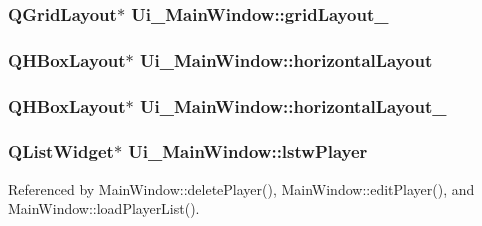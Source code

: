 \subsubsection[{grid\+Layout\+\_\+2}]{\setlength{\rightskip}{0pt plus 5cm}Q\+Grid\+Layout$\ast$ Ui\+\_\+\+Main\+Window\+::grid\+Layout\+\_}\label{class_ui___main_window_a6b2a0c5f7e8ff2a87134908dd770d2d2}
\hypertarget{class_ui___main_window_acd6fdc9ebacc4b25b834162380d75ce8}{}
\subsubsection[{horizontal\+Layout}]{\setlength{\rightskip}{0pt plus 5cm}Q\+H\+Box\+Layout$\ast$ Ui\+\_\+\+Main\+Window\+::horizontal\+Layout}\label{class_ui___main_window_acd6fdc9ebacc4b25b834162380d75ce8}
\hypertarget{class_ui___main_window_a80867018070156432923d0266cc9fe25}{}
\subsubsection[{horizontal\+Layout\+\_\+2}]{\setlength{\rightskip}{0pt plus 5cm}Q\+H\+Box\+Layout$\ast$ Ui\+\_\+\+Main\+Window\+::horizontal\+Layout\+\_}\label{class_ui___main_window_a80867018070156432923d0266cc9fe25}
\hypertarget{class_ui___main_window_a882b43c38a46678a866017cc7afcb227}{}
\subsubsection[{lstw\+Player}]{\setlength{\rightskip}{0pt plus 5cm}Q\+List\+Widget$\ast$ Ui\+\_\+\+Main\+Window\+::lstw\+Player}\label{class_ui___main_window_a882b43c38a46678a866017cc7afcb227}


Referenced by Main\+Window\+::delete\+Player(), Main\+Window\+::edit\+Player(), and Main\+Window\+::load\+Player\+List().

\hypertarget{class_ui___main_window_a18474f46054d16d420125e914595bf3a}{}
